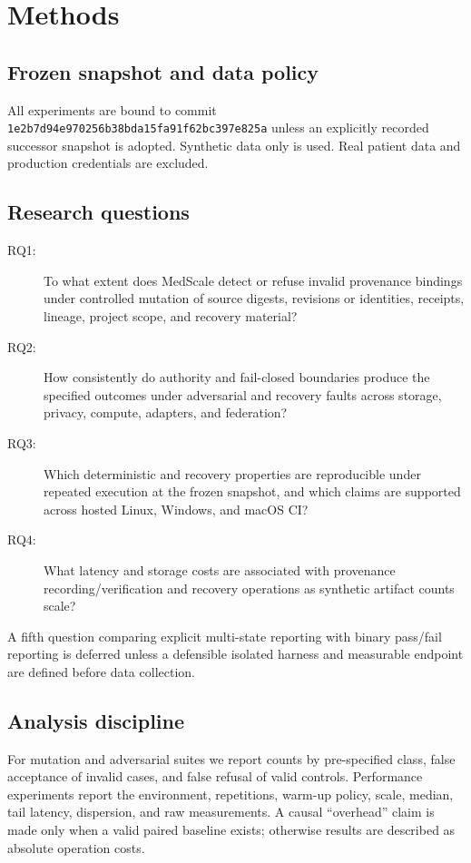 \section{Methods}

\subsection{Frozen snapshot and data policy}
All experiments are bound to commit \texttt{1e2b7d94e970256b38bda15fa91f62bc397e825a} unless an explicitly recorded successor snapshot is adopted. Synthetic data only is used. Real patient data and production credentials are excluded.

\subsection{Research questions}
\begin{description}
  \item[RQ1:] To what extent does MedScale detect or refuse invalid provenance bindings under controlled mutation of source digests, revisions or identities, receipts, lineage, project scope, and recovery material?
  \item[RQ2:] How consistently do authority and fail-closed boundaries produce the specified outcomes under adversarial and recovery faults across storage, privacy, compute, adapters, and federation?
  \item[RQ3:] Which deterministic and recovery properties are reproducible under repeated execution at the frozen snapshot, and which claims are supported across hosted Linux, Windows, and macOS CI?
  \item[RQ4:] What latency and storage costs are associated with provenance recording/verification and recovery operations as synthetic artifact counts scale?
\end{description}

A fifth question comparing explicit multi-state reporting with binary pass/fail reporting is deferred unless a defensible isolated harness and measurable endpoint are defined before data collection.

\subsection{Analysis discipline}
For mutation and adversarial suites we report counts by pre-specified class, false acceptance of invalid cases, and false refusal of valid controls. Performance experiments report the environment, repetitions, warm-up policy, scale, median, tail latency, dispersion, and raw measurements. A causal ``overhead'' claim is made only when a valid paired baseline exists; otherwise results are described as absolute operation costs.
